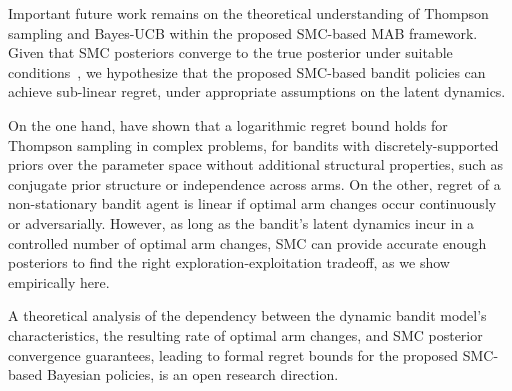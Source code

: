 Important future work remains
on the theoretical understanding of Thompson sampling and Bayes-UCB within the proposed SMC-based MAB framework.
Given that SMC posteriors converge to the true posterior under suitable conditions~\citep{b-Liu2001,j-Crisan2002,j-Chopin2004},
we hypothesize that the proposed SMC-based bandit policies can achieve sub-linear regret, under appropriate assumptions on the latent dynamics.

On the one hand, \citet{ip-Gopalan2014} have shown that a logarithmic regret bound holds for Thompson sampling in complex problems,
for bandits with discretely-supported priors over the parameter space without additional structural properties,
such as conjugate prior structure or independence across arms.
%
On the other, regret of a non-stationary bandit agent is linear if optimal arm changes occur continuously or adversarially.
However, as long as the bandit's latent dynamics incur in a controlled number of optimal arm changes,
SMC can provide accurate enough posteriors to find the right exploration-exploitation tradeoff, as we show empirically here.

A theoretical analysis of the dependency between
the dynamic bandit model's characteristics,
the resulting rate of optimal arm changes,
and SMC posterior convergence guarantees,
leading to formal regret bounds for the proposed SMC-based Bayesian policies, is an open research direction.
